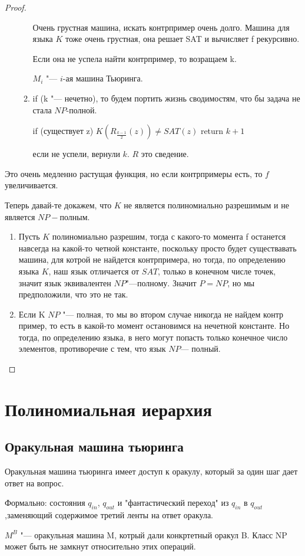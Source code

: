 \begin{proof}
\begin{enumerate}
\begin{enumerate}
    	    	Очень грустная машина, искать контрпример очень долго. Машина для языка $K$ тоже 
    		очень грустная, она решает SAT и вычисляет f рекурсивно. 

    		Если она не успела найти контрпример, то возращаем k. 
    
    		$M_i$ "--- $i$-ая машина Тьюринга. 
    		\item if (k "--- нечетно), то будем портить  жизнь сводимостям, что бы задача не стала $NP$-полной. 

    		if (существует z) $K(R_{\frac{k - 1}{2}}(z)) \ne SAT(z)$ return $k + 1$
    		
    		если не успели, вернули $k$. $R$ это сведение. 
    	\end{enumerate} 
	\end{enumerate}

	Это очень медленно растущая функция, но если контрпримеры есть, то $f$ увеличивается.

	Теперь давай-те докажем, что $K$  не является полиномиально разрешимым и не является $NP-$полным. 
	\begin{enumerate}
		\item Пусть $K$ полиномиально разрешим, тогда с какого-то момента f останется навсегда на какой-то 
		четной константе, поскольку просто будет существавать машина, для котрой не найдется контрпримера, но тогда, 
		по определению языка $K$, наш язык отличается от $SAT$, только в конечном числе точек, значит 
		язык эквивалентен $NP$"---полному. Значит $P = NP$, но мы предположили, что это не так. 	
		\item Если K $NP$ "--- полная, то мы во втором случае никогда не найдем контр пример, то 
		есть в какой-то момент остановимся на нечетной константе. 
		Но тогда, по определению языка, в него могут попасть только конечное число элементов, противоречие с тем, что язык $NP$--- полный. 
\end{enumerate}
\end{proof}

\section{Полиномиальная иерархия}
\subsection{Оракульная машина тьюринга}
	\begin{Def}
	Оракульная машина тьюринга имеет доступ к оракулу, который за один шаг
	дает ответ на вопрос. 

	Формально: состояния $q_{in}$, $q_{out}$  и "фантастический переход" из 
	$q_{in}$ в $q_{out}$,заменяющий содержимое третий ленты на ответ оракула. 
	\end{Def}
	$M^B$ "--- оракульная машина M, котрый дали конкртетный оракул B. Класс NP может быть не замкнут относительно этих операций. 


